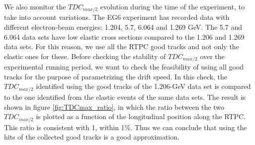 We also monitor the $TDC_{max/2}$ evolution during the time of the experiment, to take into account variations. The EG6 experiment has recorded data with different electron-beam energies: 1.204, 5.7, 6.064 and 1.269 GeV. The 5.7 and 6.064 data sets have low elastic cross sections compared to the 1.206 and 1.269 data sets. For this reason, we use all the RTPC good tracks and not only the elastic ones for these. Before checking the stability of $TDC_{max/2}$ over the experimental running period, we want to check the feasibility of using all good tracks for the purpose of parametrizing the drift speed. In this check, the $TDC_{max/2}$ identified using the good tracks of the 1.206-GeV data set is compared to the one identified from the elastic events of the same data sets. The result is shown in figure \ref{fig:TDCmax_ratio}, in which the ratio between the two $TDC_{max/2}$ is plotted as a function of the longitudinal position along the RTPC. This ratio is consistent with 1, within 1$\%$. Thus we can conclude that using the hits of the collected good tracks is a good approximation. \\

